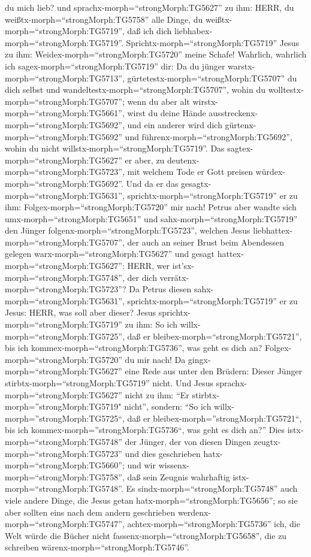 du mich lieb? und sprachx-morph=``strongMorph:TG5627'' zu ihm: HERR, du
weißtx-morph=``strongMorph:TG5758'' alle Dinge, du
weißtx-morph=``strongMorph:TG5719'', daß ich dich
liebhabex-morph=``strongMorph:TG5719''.
Sprichtx-morph=``strongMorph:TG5719'' Jesus zu ihm:
Weidex-morph=``strongMorph:TG5720'' meine Schafe! 
Wahrlich, wahrlich ich sagex-morph=``strongMorph:TG5719'' dir: Da du
jünger warstx-morph=``strongMorph:TG5713'',
gürtetestx-morph=``strongMorph:TG5707'' du dich selbst und
wandeltestx-morph=``strongMorph:TG5707'', wohin du
wolltestx-morph=``strongMorph:TG5707''; wenn du aber alt
wirstx-morph=``strongMorph:TG5661'', wirst du deine Hände
ausstreckenx-morph=``strongMorph:TG5692'', und ein anderer wird dich
gürtenx-morph=``strongMorph:TG5692'' und
führenx-morph=``strongMorph:TG5692'', wohin du nicht
willstx-morph=``strongMorph:TG5719''.  Das
sagtex-morph=``strongMorph:TG5627'' er aber, zu
deutenx-morph=``strongMorph:TG5723'', mit welchem Tode er Gott preisen
würdex-morph=``strongMorph:TG5692''. Und da er das
gesagtx-morph=``strongMorph:TG5631'',
sprichtx-morph=``strongMorph:TG5719'' er zu ihm:
Folgex-morph=``strongMorph:TG5720'' mir nach!  Petrus aber
wandte sich umx-morph=``strongMorph:TG5651'' und
sahx-morph=``strongMorph:TG5719'' den Jünger
folgenx-morph=``strongMorph:TG5723'', welchen Jesus
liebhattex-morph=``strongMorph:TG5707'', der auch an seiner Brust beim
Abendessen gelegen warx-morph=``strongMorph:TG5627'' und gesagt
hattex-morph=``strongMorph:TG5627'': HERR, wer
ist'sx-morph=``strongMorph:TG5748'', der dich
verrätx-morph=``strongMorph:TG5723''?  Da Petrus diesen
sahx-morph=``strongMorph:TG5631'', sprichtx-morph=``strongMorph:TG5719''
er zu Jesus: HERR, was soll aber dieser?  Jesus
sprichtx-morph=``strongMorph:TG5719'' zu ihm: So ich
willx-morph=``strongMorph:TG5725'', daß er
bleibex-morph=``strongMorph:TG5721'', bis ich
kommex-morph=``strongMorph:TG5736'', was geht es dich an?
Folgex-morph=``strongMorph:TG5720'' du mir nach!  Da
gingx-morph=``strongMorph:TG5627'' eine Rede aus unter den Brüdern:
Dieser Jünger stirbtx-morph=``strongMorph:TG5719'' nicht. Und Jesus
sprachx-morph=``strongMorph:TG5627'' nicht zu ihm: ``Er
stirbtx-morph=''strongMorph:TG5719" nicht'', sondern: ``So ich
willx-morph=''strongMorph:TG5725``, daß er
bleibex-morph=''strongMorph:TG5721``, bis ich
kommex-morph=''strongMorph:TG5736``, was geht es dich an?''
 Dies istx-morph=``strongMorph:TG5748'' der Jünger, der von
diesen Dingen zeugtx-morph=``strongMorph:TG5723'' und dies geschrieben
hatx-morph=``strongMorph:TG5660''; und wir
wissenx-morph=``strongMorph:TG5758'', daß sein Zeugnis wahrhaftig
istx-morph=``strongMorph:TG5748''.  Es
sindx-morph=``strongMorph:TG5748'' auch viele andere Dinge, die Jesus
getan hatx-morph=``strongMorph:TG5656''; so sie aber sollten eins nach
dem andern geschrieben werdenx-morph=``strongMorph:TG5747'',
achtex-morph=``strongMorph:TG5736'' ich, die Welt würde die Bücher nicht
fassenx-morph=``strongMorph:TG5658'', die zu schreiben
wärenx-morph=``strongMorph:TG5746''.
